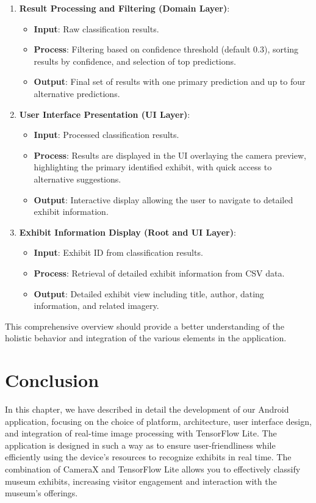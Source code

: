 \begin{enumerate}
\item \textbf{Result Processing and Filtering (Domain Layer)}:
\begin{itemize}
    \item \textbf{Input}: Raw classification results.
    \item \textbf{Process}: Filtering based on confidence threshold (default 0.3), sorting results by confidence, and selection of top predictions.
    \item \textbf{Output}: Final set of results with one primary prediction and up to four alternative predictions.
\end{itemize}

\item \textbf{User Interface Presentation (UI Layer)}:
\begin{itemize}
    \item \textbf{Input}: Processed classification results.
    \item \textbf{Process}: Results are displayed in the UI overlaying the camera preview, highlighting the primary identified exhibit, with quick access to alternative suggestions.
    \item \textbf{Output}: Interactive display allowing the user to navigate to detailed exhibit information.
\end{itemize}

\item \textbf{Exhibit Information Display (Root and UI Layer)}:
\begin{itemize}
    \item \textbf{Input}: Exhibit ID from classification results.
    \item \textbf{Process}: Retrieval of detailed exhibit information from CSV data.
    \item \textbf{Output}: Detailed exhibit view including title, author, dating information, and related imagery.
\end{itemize}
\end{enumerate}

This comprehensive overview should provide a better understanding of the holistic behavior and integration of the various elements in the application.

\section{Conclusion}

In this chapter, we have described in detail the development of our Android application, focusing on the choice of platform, architecture, user interface design, and integration of real-time image processing with TensorFlow Lite. The application is designed in such a way as to ensure user-friendliness while efficiently using the device's resources to recognize exhibits in real time. The combination of CameraX and TensorFlow Lite allows you to effectively classify museum exhibits, increasing visitor engagement and interaction with the museum's offerings.